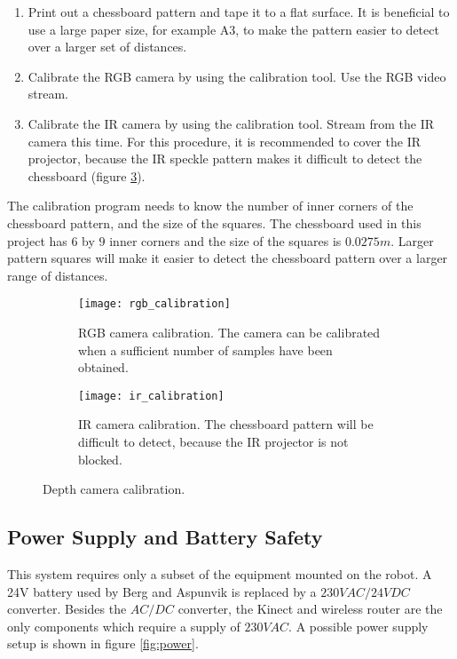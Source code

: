 \begin{enumerate}
	\item Print out a chessboard pattern and tape it to a flat surface. It is beneficial to use a large paper size, for example A3, to make the pattern easier to detect over a larger set of distances.
	\item Calibrate the RGB camera by using the calibration tool. Use the RGB video stream.
	\item Calibrate the IR camera by using the calibration tool. Stream from the IR camera this time. For this procedure, it is recommended to cover the IR projector, because the IR speckle pattern makes it difficult to detect the chessboard (figure \ref{fig:ir_calibration}).
\end{enumerate}

The calibration program needs to know the number of inner corners of the chessboard pattern, and the size of the squares. The chessboard used in this project has $6$ by $9$ inner corners and the size of the squares is $0.0275 m$. Larger pattern squares will make it easier to detect the chessboard pattern over a larger range of distances.

 \begin{figure}[h]
 	\centering
 	\begin{subfigure}[b]{0.47\textwidth}
 		\texttt{[image: rgb\_calibration]}
 		\caption{RGB camera calibration. The camera can be calibrated when a sufficient number of samples have been obtained.}
 		\label{fig:rgb_calibration}
 	\end{subfigure}
 	\begin{subfigure}[b]{0.47\textwidth}
 		
 		\texttt{[image: ir\_calibration]}
 		\caption{IR camera calibration. The chessboard pattern will be difficult to detect, because the IR projector is not blocked.}
 		\label{fig:ir_calibration}
 	\end{subfigure}
 	\caption{Depth camera calibration.}
 \end{figure}

\subsection{Power Supply and Battery Safety}

This system requires only a subset of the equipment mounted on the robot. A 24V battery used by Berg and Aspunvik is replaced by a $230VAC/24VDC$ converter. Besides the $AC/DC$ converter, the Kinect and wireless router are the only components which require a supply of $230V AC$. A possible power supply setup is shown in figure \ref{fig:power}.


